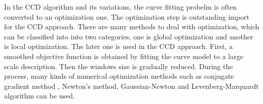 In the CCD algorithm and its variations, the curve fitting probelm is
often converted to an optimization one. The optimization step is
outstanding import for the CCD approach. There are many methods to
deal with optimization, which can be classified into  into two
categories, one is global optimization and another is local
optimization\cite{hanek2004fitting}. The later one is used in the CCD
approach. First, a smoothed objective function is obtained by fitting
the curve model to a large scale description. Then the windows size is
gradually reduced. During the process, many kinds of  numerical
optimization  methods such as  conjugate gradient method , Newton's
method, Gaussian-Newton and Levenberg-Marquardt algorithm
\cite{contourpanin2011} can be used.


